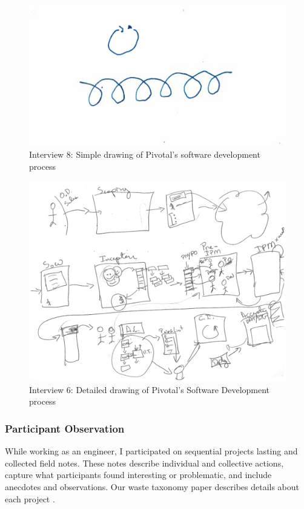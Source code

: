 \begin{figure}[htbp]
\centering
\includegraphics[width=\oneColumnWidth{}]{drawings/2015_08_12_se.png}
\caption{Interview 8: Simple drawing of Pivotal’s software development process}
\label{2015_08_12_simple}
\end{figure}

\begin{figure}[htbp]
\centering
\includegraphics[width=\oneColumnWidth{}]{drawings/2015_08_12_anchor.png}
\caption{Interview 6: Detailed drawing of Pivotal’s Software Development process}
\label{2015_08_12_detailed}
\end{figure}
\subsubsection{Participant Observation}
While working as an engineer, I participated on \numberOfObservedProjects{} sequential projects lasting \durationOfResearchStudyPlural{} and collected field notes. These notes describe individual and collective actions, capture what participants found interesting or problematic, and include anecdotes and observations. Our waste taxonomy paper describes details about each project \cite{SedanoSoftwareDevelopmentWaste}.

